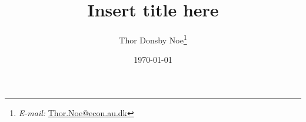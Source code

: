\usepackage{titling} %

\usepackage{authblk} %


\title{Insert title here}

\author{Thor Donsby Noe\thanks{
  \textit{E-mail:} \href{mailto:Thor.Noe@econ.au.dk}{Thor.Noe@econ.au.dk}}
}

\date{\today} %